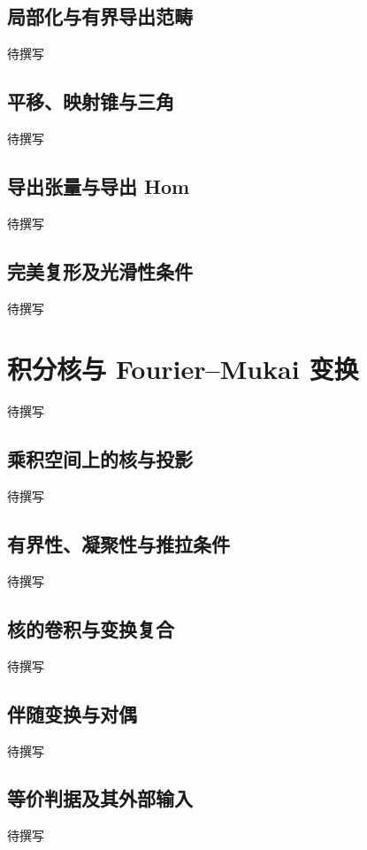 \subsection{局部化与有界导出范畴}
\label{g5:subsec:D01:02}
待撰写

\subsection{平移、映射锥与三角}
\label{g5:subsec:D01:03}
待撰写

\subsection{导出张量与导出 Hom}
\label{g5:subsec:D01:04}
待撰写

\subsection{完美复形及光滑性条件}
\label{g5:subsec:D01:05}
待撰写

\section{积分核与 Fourier–Mukai 变换}
\label{g5:sec:D02}
待撰写

\subsection{乘积空间上的核与投影}
\label{g5:subsec:D02:01}
待撰写

\subsection{有界性、凝聚性与推拉条件}
\label{g5:subsec:D02:02}
待撰写

\subsection{核的卷积与变换复合}
\label{g5:subsec:D02:03}
待撰写

\subsection{伴随变换与对偶}
\label{g5:subsec:D02:04}
待撰写

\subsection{等价判据及其外部输入}
\label{g5:subsec:D02:05}
待撰写

